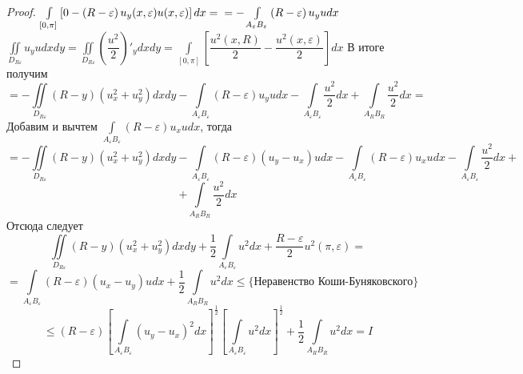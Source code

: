 \documentclass[a4paper, 9pt]{article}
\begin{document}
\begin{proof}
\begin{math}
			\int\limits_{[0,\pi]} \left[0 - \left(R - \varepsilon \right) u_y(x, \varepsilon) u(x, \varepsilon) \right] dx = \\ = - \int\limits_{A_\varepsilon B_\varepsilon} \left(R - \varepsilon \right) u_yu dx
		\end{math} \newline
		\begin{math}
			\iint\limits_{D_{R\varepsilon}} u_y u dx dy = \iint\limits_{D_{R\varepsilon}} \left(\dfrac{u^2}{2}\right)'_ydx dy = \int\limits_{[0,\pi]} \left[\dfrac{u^2(x,R)}{2} - \dfrac{u^2(x, \varepsilon)}{2}\right] dx 
		\end{math}
		\newline
		В итоге получим
		\begin{equation*}
			= - \iint\limits_{D_{R\varepsilon}} \left(R - y\right) \left(u_x^2 + u_y^2\right) dx dy
			- \int\limits_{A_\varepsilon B_\varepsilon} \left(R - \varepsilon\right) u_y u dx 
			-\int\limits_{A_\varepsilon B_\varepsilon} \dfrac{u^2}{2} dx + \int\limits_{A_R B_R} \dfrac{u^2}{2} dx = 
		\end{equation*}
		Добавим и вычтем $\int\limits_{A_\varepsilon B_\varepsilon} \left(R - \varepsilon\right) u_x u dx$, тогда
		\begin{equation*}
			= - \iint\limits_{D_{R\varepsilon}} \left(R - y\right) \left(u_x^2 + u_y^2\right) dx dy - 
			\int\limits_{A_\varepsilon B_\varepsilon} \left(R - \varepsilon \right) \left(u_y - u_x\right)u dx - \int\limits_{A_\varepsilon B_\varepsilon} \left(R - \varepsilon\right) u_x u dx - \int\limits_{A_\varepsilon B_\varepsilon}\dfrac{u^2}{2} dx +
		\end{equation*}
		\begin{equation*}
			+ \int\limits_{A_R B_R} \dfrac{u^2}{2}dx
		\end{equation*}
		Отсюда следует
		\begin{equation*}
			\iint\limits_{D_{R\varepsilon}} \left(R - y\right) \left(u_x^2 + u_y^2\right) dx dy + \dfrac{1}{2}\int\limits_{A_\varepsilon B_\varepsilon} u^2 dx +\dfrac{R - \varepsilon}{2}u^2(\pi, \varepsilon)  =
		\end{equation*}
		\begin{equation*}
			= \int\limits_{A_\varepsilon B_\varepsilon} \left(R - \varepsilon \right) \left(u_x - u_y\right)u dx + \dfrac12  \int\limits_{A_R B_R} u^2 dx \leq \{ \text{Неравенство Коши-Буняковского} \}
		\end{equation*}
		\begin{equation*}
			\leq \left(R - \varepsilon\right) \left[\int\limits_{A_\varepsilon B_\varepsilon} \left( u_y - u_x\right)^2 dx \right]^{\frac12} \left[\int\limits_{A_\varepsilon B_\varepsilon} u^2 dx \right]^{\frac12} + \dfrac12 \int\limits_{A_RB_R} u^2 dx = I

\end{equation*}
\end{proof}
\end{document}
